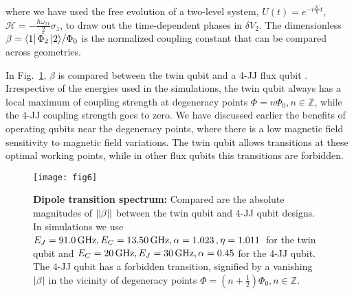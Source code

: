 \noindent   where   we    have   used   the   free   evolution   of    a   two-level   system,
$                   U(t)=e^{-i                    \frac{\mathcal{H}}{\hbar}t}                   $,
$  \mathcal{H}  =   -\frac{\hbar\omega_{21}}{2}\sigma_z  $,  to  draw  out  the   time-dependent  phases  in
$\delta  V_2$.   The dimensionless  $\beta  =  {\Bra{1}\hat{\Phi_2}\Ket{2}}/{\Phi_0}  $ is  the  normalized
coupling constant that can be compared across geometries.

In  Fig.~\ref{fig:fig5},  $\beta$ is  compared  between  the twin  qubit  and  a 4-JJ  flux  qubit
\cite{honigl2018} .   Irrespective of  the energies  used in the  simulations, the  twin qubit
always    has   a    local   maximum    of    coupling   strength    at   degeneracy    points
$ \Phi = n\Phi_0,  n\in\mathbb{Z} $, while the 4-JJ coupling strength goes  to zero. We have discussed
earlier the  benefits of operating  qubits near  the degeneracy points,  where there is  a low
magnetic field sensitivity to magnetic field  variations.  The twin qubit allows \ilra
{}  transitions  at these  optimal  working  points, while  in  other  flux qubits  this
transitions are forbidden.

\begin{figure}[h]
  \centering \texttt{[image: fig6]}
  \caption{\small \textbf{Dipole  transition spectrum:} Compared are the absolute magnitudes of $\left|\left|\beta\right|\right|$
    between the twin qubit and 4-JJ qubit designs. In simulations we use $ E_J =  91.0\,\text{GHz}, E_C  = 13.50\,\text{GHz}, \alpha  = 1.023\,\text{},  \eta =1.011\,\text{} $ for the twin qubit and
    $ E_{C} = 20\,\text{GHz}, E_J=30\,\text{GHz}, \alpha=0.45 $ for the 4-JJ qubit. The 4-JJ qubit has a forbidden  \ilra {} transition, signified by a vanishing $\left|\beta\right|$ in the vicinity of degeneracy points $  \Phi =  (n+\frac{1}{2})\Phi_0,  n\in\mathbb{Z}  $.
    \label{fig:fig5}}
\end{figure}


 
